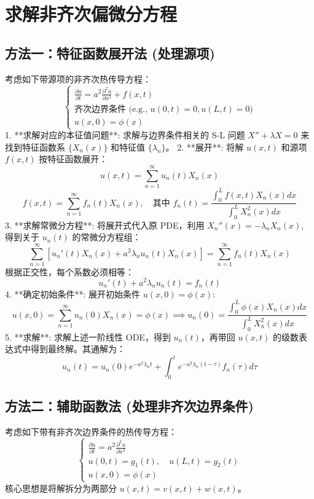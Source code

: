 \documentclass{article}
\begin{document}
	\section{求解非齐次偏微分方程}
	
	\subsection{方法一：特征函数展开法 (处理源项)}
	考虑如下带源项的非齐次热传导方程：
	$$
	\begin{cases}
		\frac{\partial u}{\partial t} = a^2 \frac{\partial^2 u}{\partial x^2} + f(x,t) \\
		\text{齐次边界条件 (e.g., } u(0,t)=0, u(L,t)=0) \\
		u(x,0) = \phi(x)
	\end{cases}
	$$
	1.  **求解对应的本征值问题**: 求解与边界条件相关的 S-L 问题 $X'' + \lambda X = 0$ 来找到特征函数系 $\{X_n(x)\}$ 和特征值 $\{\lambda_n\}$。
	2.  **展开**: 将解 $u(x,t)$ 和源项 $f(x,t)$ 按特征函数展开：
	$$
	u(x,t) = \sum_{n=1}^\infty u_n(t) X_n(x)
	$$
	$$
	f(x,t) = \sum_{n=1}^\infty f_n(t) X_n(x), \quad \text{其中 } f_n(t) = \frac{\int_0^L f(x,t)X_n(x)dx}{\int_0^L X_n^2(x)dx}
	$$
	3.  **求解常微分方程**: 将展开式代入原 PDE，利用 $X_n''(x) = -\lambda_n X_n(x)$, 得到关于 $u_n(t)$ 的常微分方程组：
	$$
	\sum_{n=1}^\infty \left[ u_n'(t) X_n(x) + a^2 \lambda_n u_n(t) X_n(x) \right] = \sum_{n=1}^\infty f_n(t) X_n(x)
	$$
	根据正交性，每个系数必须相等：
	$$
	u_n'(t) + a^2 \lambda_n u_n(t) = f_n(t)
	$$
	4.  **确定初始条件**: 展开初始条件 $u(x,0) = \phi(x)$:
	$$
	u(x,0) = \sum_{n=1}^\infty u_n(0) X_n(x) = \phi(x) \implies u_n(0) = \frac{\int_0^L \phi(x)X_n(x)dx}{\int_0^L X_n^2(x)dx}
	$$
	5.  **求解**: 求解上述一阶线性 ODE，得到 $u_n(t)$，再带回 $u(x,t)$ 的级数表达式中得到最终解。其通解为：
	$$
	u_n(t) = u_n(0) e^{-a^2\lambda_n t} + \int_0^t e^{-a^2\lambda_n(t-\tau)} f_n(\tau) d\tau
	$$
	
	\subsection{方法二：辅助函数法 (处理非齐次边界条件)}
	考虑如下带有非齐次边界条件的热传导方程：
	$$
	\begin{cases}
		\frac{\partial u}{\partial t} = a^2 \frac{\partial^2 u}{\partial x^2} \\
		u(0,t) = g_1(t), \quad u(L,t) = g_2(t) \\
		u(x,0) = \phi(x)
	\end{cases}
	$$
	核心思想是将解拆分为两部分 $u(x,t) = v(x,t) + w(x,t)$。
	
\end{document}
